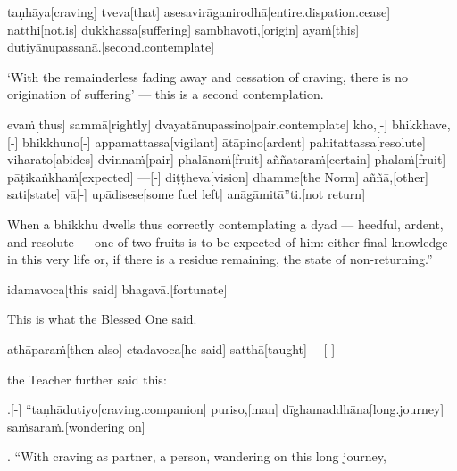 \begin{samepage}
\begingl[glneveryline={\PaliGlossA,\PaliGlossB}]
taṇhāya[craving] tveva[that] asesavirāganirodhā[entire.dispation.cease] natthi[not.is] dukkhassa[suffering] sambhavoti,[origin] ayaṁ[this] dutiyānupassanā.[second.contemplate]
\endgl
\nopagebreak
\linespread{0.5}
\begin{spacin}{0.2}
{\PaliGlossFT ‘With the remainderless fading away and cessation of craving, there is no origination of suffering’ — this is a second contemplation.}
\end{spacin}
\vskip 12pt
\end{samepage}
\begin{samepage}
\begingl[glneveryline={\PaliGlossA,\PaliGlossB}]
evaṁ[thus] sammā[rightly] dvayatānupassino[pair.contemplate] kho,[-] bhikkhave,[-] bhikkhuno[-] appamattassa[vigilant] ātāpino[ardent] pahitattassa[resolute] viharato[abides] dvinnaṁ[pair] phalānaṁ[fruit] aññataraṁ[certain] phalaṁ[fruit] pāṭikaṅkhaṁ[expected] —[-] diṭṭheva[vision] dhamme[the Norm] aññā,[other] sati[state] vā[-] upādisese[some fuel left] anāgāmitā”ti.[not return]
\endgl
\nopagebreak
\linespread{0.5}
\begin{spacin}{0.2}
{\PaliGlossFT When a bhikkhu dwells thus correctly contemplating a dyad — heedful, ardent, and resolute — one of two fruits is to be expected of him: either final knowledge in this very life or, if there is a residue remaining, the state of non-returning.”}
\end{spacin}
\vskip 12pt
\end{samepage}
\begin{samepage}
\begingl[glneveryline={\PaliGlossA,\PaliGlossB}]
idamavoca[this said] bhagavā.[fortunate]
\endgl
\nopagebreak
\linespread{0.5}
\begin{spacin}{0.2}
{\PaliGlossFT This is what the Blessed One said.}
\end{spacin}
\vskip 12pt
\end{samepage}
\begin{samepage}
\begingl[glneveryline={\PaliGlossA,\PaliGlossB}]
athāparaṁ[then also] etadavoca[he said] satthā[taught] —[-]
\endgl
\nopagebreak
\linespread{0.5}
\begin{spacin}{0.2}
{\PaliGlossFT the Teacher further said this:}
\end{spacin}
\vskip 12pt
\end{samepage}
\vskip 0.2in
\begin{samepage}
.[-] “taṇhādutiyo[craving.companion] puriso,[man] dīghamaddhāna[long.journey] saṁsaraṁ.[wondering on]
\endgl
\nopagebreak
\linespread{0.5}
\begin{spacin}{0.2}
{. “With craving as partner, a person, wandering on this long journey,}
\end{spacin}
\vskip 12pt
\end{samepage}
